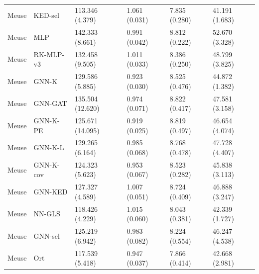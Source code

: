 \begin{tabular}{llllll}
Meuse & KED-sel & 113.346 (4.379) & 1.061 (0.031) & 7.835 (0.280) & 41.191 (1.683) \\
Meuse & MLP & 142.333 (8.661) & 0.991 (0.042) & 8.812 (0.222) & 52.670 (3.328) \\
Meuse & RK-MLP-v3 & 132.458 (9.505) & 1.011 (0.033) & 8.386 (0.250) & 48.799 (3.825) \\
Meuse & GNN-K & 129.586 (5.885) & 0.923 (0.030) & 8.525 (0.476) & 44.872 (1.382) \\
Meuse & GNN-GAT & 135.504 (12.620) & 0.974 (0.071) & 8.822 (0.417) & 47.581 (3.158) \\
Meuse & GNN-K-PE & 125.671 (14.095) & 0.919 (0.025) & 8.819 (0.497) & 46.654 (4.074) \\
Meuse & GNN-K-L & 129.265 (6.164) & 0.985 (0.068) & 8.768 (0.478) & 47.728 (4.407) \\
Meuse & GNN-K-cov & 124.323 (5.623) & 0.953 (0.067) & 8.523 (0.282) & 45.838 (3.113) \\
Meuse & GNN-KED & 127.327 (4.589) & 1.007 (0.051) & 8.724 (0.409) & 46.888 (3.247) \\
Meuse & NN-GLS & 118.426 (4.229) & 1.015 (0.060) & 8.043 (0.381) & 42.339 (1.727) \\
Meuse & GNN-sel & 125.219 (6.942) & 0.983 (0.082) & 8.224 (0.554) & 46.247 (4.538) \\
Meuse & Ort & 117.539 (5.418) & 0.947 (0.037) & 7.866 (0.414) & 42.668 (2.981) \\
\bottomrule
\end{tabular}

